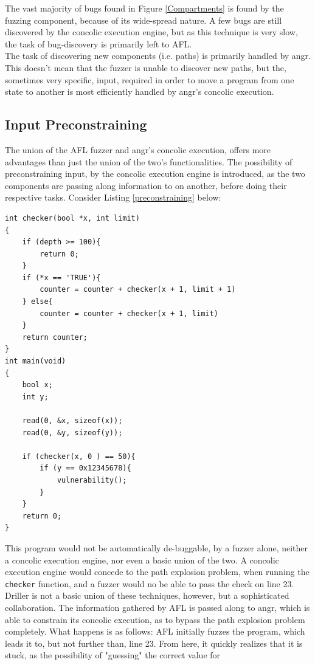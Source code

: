 \documentclass[a4paper]{article}
\newcommand{\ttt}[1]{\texttt{#1}}
\begin{document}
The vast majority of bugs found in Figure \ref{Compartments} is found by the fuzzing component, because of its wide-spread nature. A few bugs are still discovered by the concolic execution engine, but as this technique is very slow, the task of bug-discovery is primarily left to AFL.\\[0.1cm]
The task of discovering new components (i.e. paths) is primarily handled by angr. This doesn't mean that the fuzzer is unable to discover new paths, but the, sometimes very specific, input, required in order to move a program from one state to another is most efficiently handled by angr's concolic execution.
\subsection{Input Preconstraining}
\label{sec:preconstraining}
The union of the AFL fuzzer and angr's concolic execution, offers more advantages than just the union of the two's functionalities. The possibility of preconstraining input, by the concolic execution engine is introduced, as the two components are passing along information to on another, before doing their respective tasks. Consider Listing \ref{preconstraining} below:
\begin{lstlisting}[caption=A program in need of preconstraining,
label=preconstraining, captionpos=b]
int checker(bool *x, int limit)
{
    if (depth >= 100){
        return 0;
    }
    if (*x == 'TRUE'){
        counter = counter + checker(x + 1, limit + 1)
    } else{
        counter = counter + checker(x + 1, limit)
    }
    return counter;
} 
int main(void)
{
    bool x;
    int y;
    
    read(0, &x, sizeof(x));
    read(0, &y, sizeof(y));

    if (checker(x, 0 ) == 50){
        if (y == 0x12345678){
            vulnerability();
        }
    }	
    return 0;
}
\end{lstlisting}
This program would not be automatically de-buggable, by a fuzzer alone, neither a concolic execution engine, nor even a basic union of the two. A concolic execution engine would concede to the path explosion problem, when running the \ttt{checker} function, and a fuzzer would no be able to pass the check on line 23. Driller is not a basic union of these techniques, however, but a sophisticated collaboration. The information  gathered by AFL is passed along to angr, which is able to constrain its concolic execution, as to bypass the path explosion problem completely. What happens is as follows: AFL initially fuzzes the program, which leads it to, but not further than, line 23. From here, it quickly realizes that it is stuck, as the possibility of "guessing" the correct value for 
\end{document}
